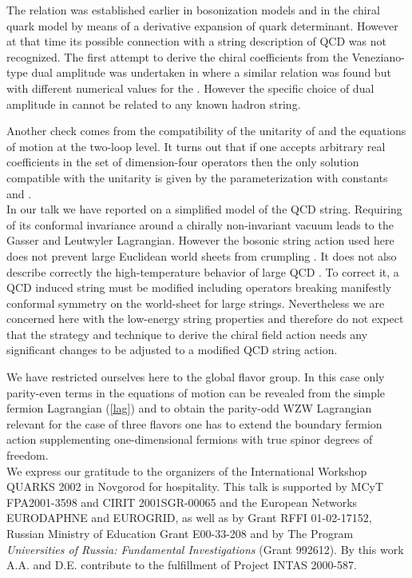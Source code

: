 \documentclass[a4paper,12pt]{article}
\begin{document}
The relation
\coordHE{} was
established earlier
in bosonization models \cite{AnBo}
and in the chiral quark model\cite{Espr} by means of
a derivative expansion of quark determinant. However at that time its possible
connection with a string
description of QCD was not recognized. The first attempt to derive the
chiral coefficients from the Veneziano-type dual amplitude was
undertaken in\cite{PV} where  a similar relation was found but with different numerical values for the \coordHE{}. 
However the specific choice of dual amplitude in \cite{PV}
cannot be related to any known hadron string.

Another check
comes from the compatibility of the unitarity of \coordHE{} 
and the equations of motion at the two-loop 
level. It turns out that if 
one accepts arbitrary real coefficients
in the set of dimension-four operators then the 
only solution
compatible with the unitarity is given by the parameterization with 
constants \coordHE{} and
\coordHE{}. \\

In our talk we have reported on a simplified model of the QCD string.
Requiring of its conformal invariance 
around a chirally non-invariant vacuum leads to the Gasser and
Leutwyler
Lagrangian. However the  bosonic string
action used here does not prevent large Euclidean 
world sheets from crumpling \cite{pol1}. It does not also describe correctly
the high-temperature behavior of large \coordHE{} QCD \cite{polch2}. To correct it,
a QCD induced string must be modified \cite{pol1,diam}  including 
operators breaking manifestly conformal symmetry
on the world-sheet for large strings. Nevertheless we are concerned here
with the low-energy string properties and therefore do not expect that the strategy
and technique to derive the chiral field action needs any significant
changes to be adjusted to a modified QCD string action. 

We have restricted ourselves here to the \coordHE{} 
global flavor
group. In this case only parity-even terms in the equations 
of motion can be
revealed from the simple fermion Lagrangian (\ref{lag}) and to obtain the parity-odd
WZW Lagrangian relevant for the case of three flavors one has to extend the
boundary fermion action supplementing one-dimensional fermions 
with true spinor degrees of freedom.\\

We express our gratitude to the organizers of the
International Workshop QUARKS 2002 in Novgorod for
hospitality.
This talk is supported by
MCyT FPA2001-3598 and CIRIT 2001SGR-00065 and the European
Networks EURODAPHNE and EUROGRID, as well as by Grant RFFI
01-02-17152, Russian
Ministry of Education Grant E00-33-208 and by The Program {\sl Universities
of Russia: Fundamental Investigations} (Grant 992612). By this work A.A. and 
D.E. contribute 
to the fulfillment of  Project INTAS 2000-587.
\end{document}
